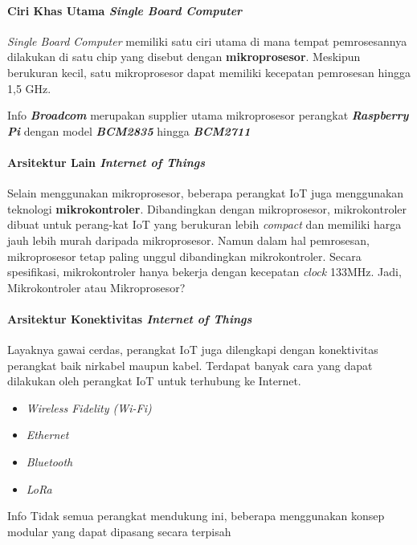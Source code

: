 \begin{frame}{\insertsectionhead}
	\framesubtitle{Ciri Khas Utama \textit{Single Board Computer}}
	\justifying
	\textit{Single Board Computer} memiliki satu ciri utama di mana tempat pemrosesannya dilakukan di satu chip yang disebut dengan \textbf{mikroprosesor}. Meskipun berukuran kecil, satu mikroprosesor dapat memiliki kecepatan pemrosesan hingga 1,5 GHz.
	\vfill
	\begin{block}{Info}
		\textit{\textbf{Broadcom}} merupakan supplier utama mikroprosesor perangkat \textit{\textbf{Raspberry Pi}} dengan model \textit{\textbf{BCM2835}} hingga \textit{\textbf{BCM2711}}
	\end{block}
\end{frame}

\begin{frame}{\insertsectionhead}
	\framesubtitle{Arsitektur Lain \textit{Internet of Things}}
	\justifying
	Selain menggunakan mikroprosesor, beberapa perangkat IoT juga menggunakan teknologi \textbf{mikrokontroler}. Dibandingkan dengan mikroprosesor, mikrokontroler dibuat untuk perang-kat IoT yang berukuran lebih \textit{compact} dan memiliki harga jauh lebih murah daripada mikroprosesor.
	\vfill
	Namun dalam hal pemrosesan, mikroprosesor tetap paling unggul dibandingkan mikrokontroler. Secara spesifikasi, mikrokontroler hanya bekerja dengan kecepatan \textit{clock} 133MHz.
	\vfill
	Jadi, Mikrokontroler atau Mikroprosesor?
\end{frame}

\begin{frame}{\insertsectionhead}
	\framesubtitle{Arsitektur Konektivitas \textit{Internet of Things}}
	\justifying
	Layaknya gawai cerdas, perangkat IoT juga dilengkapi dengan konektivitas perangkat baik nirkabel maupun kabel. Terdapat banyak cara yang dapat dilakukan oleh perangkat IoT untuk terhubung ke Internet.
	\vfill
	\begin{multicols}{2}
		\begin{itemize}
			\item \textit{Wireless Fidelity (Wi-Fi)}
			\item \textit{Ethernet}
			\item \textit{Bluetooth}
			\item \textit{LoRa}
		\end{itemize}
	\end{multicols}
	\vfill
	\begin{block}{Info}
		Tidak semua perangkat mendukung ini, beberapa menggunakan konsep modular yang dapat dipasang secara terpisah
	\end{block}
\end{frame}

